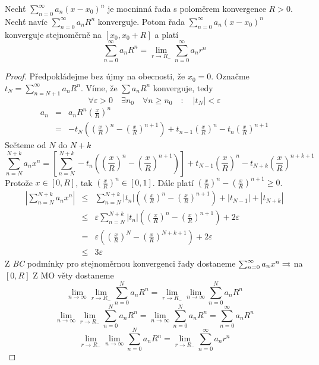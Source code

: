 \begin{vetat}[Abelova]
Nechť $\sum_{n=0}^{\infty} a_n (x-x_0)^n$ je mocninná řada s poloměrem konvergence $R > 0$. Nechť navíc $\sum_{n=0}^{\infty} a_n R^n$ konverguje. Potom řada $\sum_{n=0}^{\infty} a_n (x-x_0)^n$ konverguje stejnoměrně na $[ x_0, x_0 + R ]$ a platí
$$\sum_{n=0}^{\infty} a_n R^n = \lim_{r \rightarrow R_-} \sum_{n=0}^{\infty} a_n r^n$$
\end{vetat}

\begin{proof}
Předpokládejme bez újmy na obecnosti, že $x_0 = 0$. Označme $t_N = \sum_{n=N+1}^{\infty} a_n R^n$. Víme, že $\sum a_n R^n$ konverguje, tedy
$$\forall \varepsilon>0 \quad \exists n_0 \quad \forall n \geq n_0 \quad : \quad |t_N| < \varepsilon$$
\begin{eqnarray*}
a_n & = & a_n R^n \left( \frac{x}{R} \right)^n \\
& = & - t_N \left( \left( \frac{x}{R} \right)^n - \left( \frac{x}{R} \right)^{n+1} \right) + t_{n-1} \left( \frac{x}{R} \right)^n - t_n \left( \frac{x}{R} \right)^{n+1} 
\end{eqnarray*}
Sečteme od $N$ do $N+k$
$$\sum_{n=N}^{N+k} a_n x^n = \left[ \sum_{n=N}^{N+k} -t_n \left( \left( \frac{x}{R} \right)^n - \left( \frac{x}{R} \right)^{n+1} \right) \right] + t_{N-1} \left( \frac{x}{R} \right)^n - t_{N+k} \left( \frac{x}{R} \right)^{n+k+1}$$
Protože $x \in [0, R]$, tak $\left( \frac{x}{R} \right)^n \in [0,1]$. Dále platí $\left( \frac{x}{R} \right)^{n} - \left( \frac{x}{R} \right)^{n+1} \geq 0$.
\begin{eqnarray*}
\left|\sum_{n=N}^{N+k} a_n x^n \right| & \leq & \sum_{n=N}^{N+k} |t_n| \left( \left( \frac{x}{R} \right)^{n} - \left( \frac{x}{R} \right)^{n+1} \right) + |t_{N-1}| + |t_{N+k}| \\
& \leq & \varepsilon \sum_{n=N}^{N+k} |t_n| \left( \left( \frac{x}{R} \right)^{n} - \left( \frac{x}{R} \right)^{n+1} \right) + 2 \varepsilon \\
& = & \varepsilon \left( \left( \frac{x}{R} \right)^{N} - \left( \frac{x}{R} \right)^{N+k+1} \right) + 2 \varepsilon \\
& \leq & 3 \varepsilon 
\end{eqnarray*}
Z \emph{BC} podmínky pro stejnoměrnou konvergenci řady dostaneme $\sum_{n=0}^{\infty} a_n x^n \rightrightarrows$ na $[0, R]$
Z MO věty dostaneme
$$\lim_{n \rightarrow \infty} \lim_{r \rightarrow R_-} \sum_{n=0}^{N} a_n R^n = \lim_{r \rightarrow R_-} \lim_{n \rightarrow \infty} \sum_{n=0}^{N} a_n R^n$$
$$\lim_{n \rightarrow \infty} \lim_{r \rightarrow R_-} \sum_{n=0}^{N} a_n R^n = \lim_{n \rightarrow \infty} \sum_{n=0}^{N} a_n R^n = \sum_{n=0}^{\infty} a_n R^n$$
$$\lim_{r \rightarrow R_-} \lim_{n \rightarrow \infty} \sum_{n=0}^{N} a_n R^n = \lim_{r \rightarrow R_-} \sum_{n=0}^{\infty} a_n r^n$$
\end{proof}

